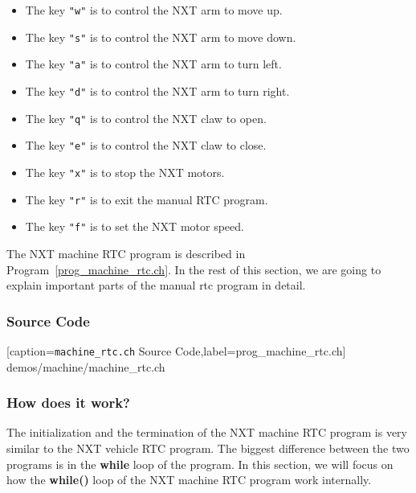 \documentclass[11pt]{article}
\begin{document}
\begin{itemize}
\item The key {\tt "w"} is to control the NXT arm to move up.
\item The key {\tt "s"} is to control the NXT arm to move down.
\item The key {\tt "a"} is to control the NXT arm to turn left.
\item The key {\tt "d"} is to control the NXT arm to turn right.
\item The key {\tt "q"} is to control the NXT claw to open.
\item The key {\tt "e"} is to control the NXT claw to close.
\item The key {\tt "x"} is to stop the NXT motors.
\item The key {\tt "r"} is to exit the manual RTC program.
\item The key {\tt "f"} is to set the NXT motor speed.
\end{itemize}
The NXT machine RTC program is described in Program~\ref{prog_machine_rtc.ch}. 
In the rest of this section, we are going to explain important parts of the 
manual rtc program in detail.

\subsubsection*{Source Code}

[caption={{\tt machine\_rtc.ch} Source Code},label=prog_machine_rtc.ch]
{demos/machine/machine_rtc.ch}

\subsubsection*{How does it work?}
The initialization and the termination of the NXT machine RTC program is very 
similar to the NXT vehicle RTC program. The biggest difference between the two 
programs is in the {\bf while} loop of the program. In this section, we will 
focus on how the {\bf while()} loop of the NXT machine RTC program work 
internally.
\end{document}
